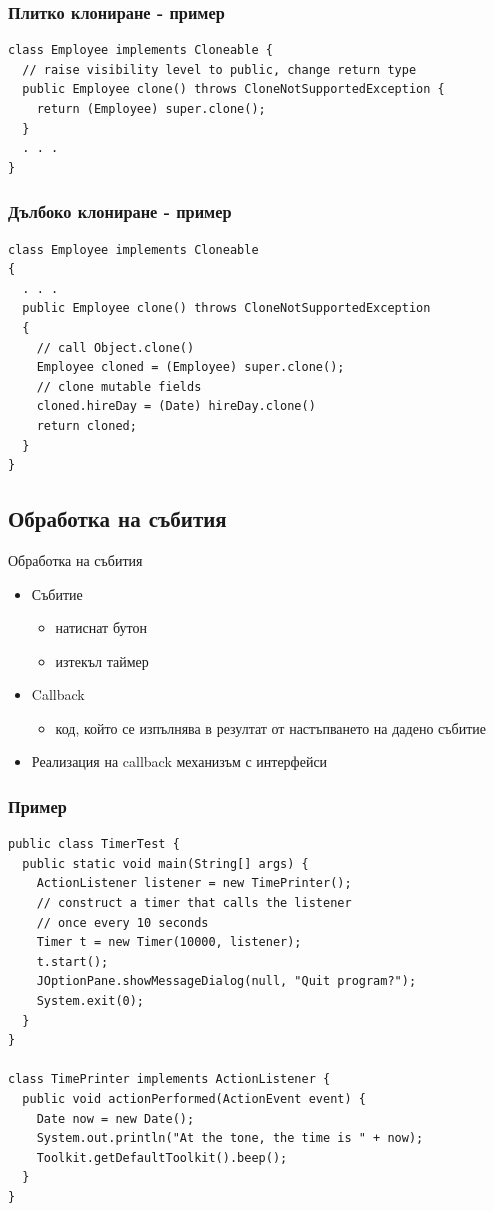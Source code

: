 \documentclass{beamer}
\begin{document}
\begin{frame}[fragile]
  \frametitle{Плитко клониране - пример}
  \transdissolve
\begin{lstlisting}
class Employee implements Cloneable {
  // raise visibility level to public, change return type
  public Employee clone() throws CloneNotSupportedException {
    return (Employee) super.clone();
  }
  . . .
}
\end{lstlisting}
\end{frame}

\begin{frame}[fragile]
  \frametitle{Дълбоко клониране - пример}
  \transdissolve
\begin{lstlisting}
class Employee implements Cloneable
{
  . . .
  public Employee clone() throws CloneNotSupportedException
  {
    // call Object.clone()
    Employee cloned = (Employee) super.clone();
    // clone mutable fields
    cloned.hireDay = (Date) hireDay.clone()
    return cloned;
  }
}  
\end{lstlisting}
\end{frame}

\subsection{Обработка на събития}
\begin{frame}{Обработка на събития}
  \transdissolve
  \begin{itemize}
  \item Събитие \pause
    \begin{itemize}
      \item натиснат бутон \pause
      \item изтекъл таймер \pause
    \end{itemize}
  \item Callback
    \begin{itemize}
      \item код, който се изпълнява в резултат от настъпването на
        дадено събитие \pause
    \end{itemize}
  \item Реализация на callback механизъм с интерфейси
  \end{itemize}
\end{frame}

\begin{frame}[fragile]
  \frametitle{Пример}
  \transdissolve
\begin{lstlisting}[basicstyle=\tiny]
public class TimerTest {
  public static void main(String[] args) {
    ActionListener listener = new TimePrinter();
    // construct a timer that calls the listener
    // once every 10 seconds
    Timer t = new Timer(10000, listener);
    t.start();
    JOptionPane.showMessageDialog(null, "Quit program?");
    System.exit(0);
  }
}

class TimePrinter implements ActionListener {
  public void actionPerformed(ActionEvent event) {
    Date now = new Date();
    System.out.println("At the tone, the time is " + now);
    Toolkit.getDefaultToolkit().beep();
  }
}
\end{lstlisting}
\end{frame}
\end{document}
